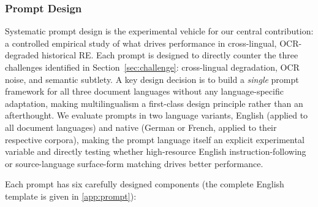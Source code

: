 \documentclass[
]{ceurart}
\theoremstyle{definition}
\begin{document}
\subsubsection{Prompt Design}

Systematic prompt design is the experimental vehicle for our central contribution: a controlled empirical study of what drives performance in cross-lingual, OCR-degraded historical RE.
Each prompt is designed to directly counter the three challenges identified in Section~\ref{sec:challenge}: cross-lingual degradation, OCR noise, and semantic subtlety.
A key design decision is to build a \emph{single} prompt framework for all three document languages without any language-specific adaptation, making multilingualism a first-class design principle rather than an afterthought.
We evaluate prompts in two language variants, English (applied to all document languages) and native (German or French, applied to their respective corpora), making the prompt language itself an explicit experimental variable and directly testing whether high-resource English instruction-following or source-language surface-form matching drives better performance.

Each prompt has six carefully designed components (the complete English template is given in \ref{app:prompt}):
\end{document}

